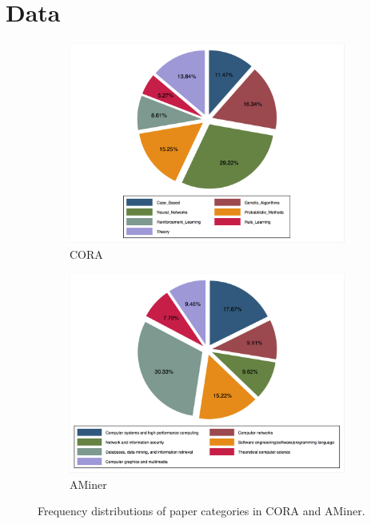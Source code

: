 \documentclass[11pt]{article}
\begin{document}
\section{Data\label{sec:data}}

\begin{figure}[H]
    \centering
    \begin{subfigure}[c]{.45\textwidth}
        \includegraphics[width=1.0\textwidth]{figures/cora_categoriesPercent_piechart.png}
        \caption{CORA}
        \label{fig:cora_catPercent}
    \end{subfigure}
    \begin{subfigure}[c]{.45\textwidth}
        \includegraphics[width=1.0\textwidth]{figures/aminer_categoriesPercent_piechart.png}
        \caption{AMiner}
        \label{fig:aminer_catPercent}
    \end{subfigure}
    \caption{Frequency distributions of paper categories in CORA and AMiner.}
    \label{fig:dataset_catPercent}
\end{figure}
\end{document}
